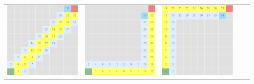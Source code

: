 \documentclass{article}
\begin{document}
\begin{center}
\begin{tabular}{c c c c c}
\includegraphics[scale=0.15]{images/scr2.png} &
\includegraphics[scale=0.15]{images/scr3.png} &
\includegraphics[scale=0.15]{images/scr4.png} \\

\end{tabular}
\end{center}
\end{document}
